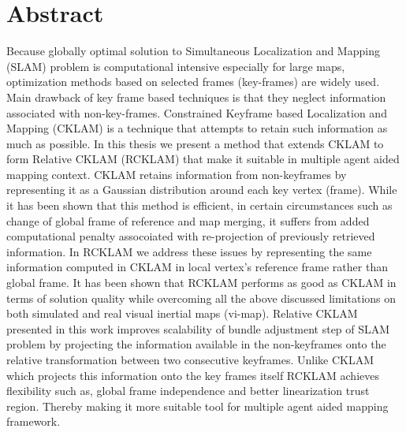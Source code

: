\chapter*{Abstract}

Because globally optimal solution to Simultaneous Localization and Mapping (SLAM) problem is computational intensive especially for large maps, optimization methods based on selected frames (key-frames) are widely used. Main drawback of key frame based techniques is that they neglect information associated with non-key-frames. Constrained Keyframe based Localization and Mapping (CKLAM) is a technique that attempts to retain such information as much as possible. In this thesis we present a method that extends CKLAM to form Relative CKLAM (RCKLAM) that make it suitable in multiple agent aided mapping context. CKLAM retains information from non-keyframes by representing it as a Gaussian distribution around each key vertex (frame). While it has been shown that this method is efficient, in certain circumstances such as change of global frame of reference and map merging, it suffers from added computational penalty assocoiated with re-projection of previously retrieved information. In RCKLAM we address these issues by representing the same information computed in CKLAM in local vertex's reference frame rather than global frame. It has been shown that RCKLAM performs as good as CKLAM in terms of solution quality while overcoming all the above discussed limitations on both simulated and real visual inertial maps (vi-map). Relative CKLAM presented in this work improves scalability of bundle adjustment step of SLAM problem by projecting the information available in the non-keyframes onto the relative transformation between two consecutive keyframes. Unlike CKLAM which projects this information onto the key frames itself RCKLAM achieves flexibility such as, global frame independence and better linearization trust region. Thereby making it more suitable tool for multiple agent aided mapping framework.